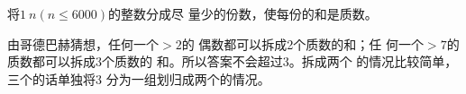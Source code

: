 \begin{prob}
	将$1~n$$(n\le 6000)$的整数分成尽
	量少的份数，使每份的和是质数。
\end{prob}

\begin{sol}
	由哥德巴赫猜想，任何一个$>2$的
	偶数都可以拆成2个质数的和；任
	何一个$>7$的质数都可以拆成3个质数的
	和。所以答案不会超过3。拆成两个
	的情况比较简单，三个的话单独将3
	分为一组划归成两个的情况。
\end{sol}
